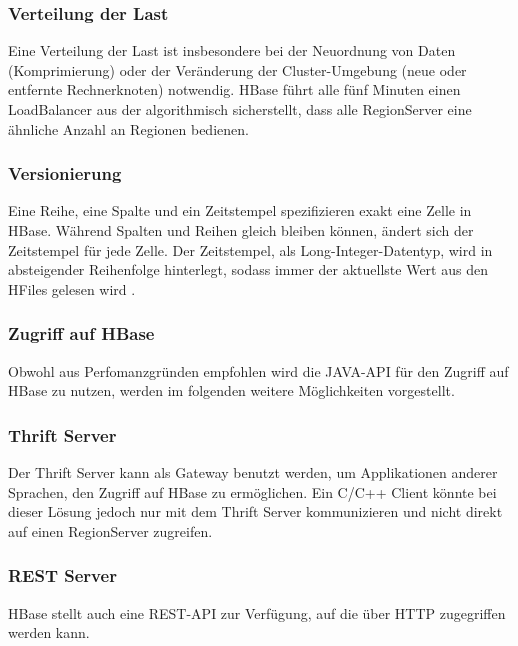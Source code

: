 \subsubsection{Verteilung der Last}
Eine Verteilung der Last ist insbesondere bei der Neuordnung von Daten (Komprimierung) oder der Veränderung der Cluster-Umgebung (neue oder entfernte Rechnerknoten) notwendig.
HBase führt alle fünf Minuten einen LoadBalancer aus der algorithmisch sicherstellt, dass alle RegionServer eine ähnliche Anzahl an Regionen bedienen. 

 \subsubsection{Versionierung}
Eine Reihe, eine Spalte und ein Zeitstempel spezifizieren exakt eine Zelle in HBase. Während Spalten und Reihen gleich bleiben können, ändert sich der Zeitstempel für jede Zelle. Der Zeitstempel, als Long-Integer-Datentyp, wird in absteigender Reihenfolge hinterlegt, sodass immer der aktuellste Wert aus den HFiles gelesen wird \cite{reference}.


\subsubsection{Zugriff auf HBase}
Obwohl aus Perfomanzgründen empfohlen wird die JAVA-API für den Zugriff auf HBase zu nutzen, werden im folgenden weitere Möglichkeiten vorgestellt.

\subsubsection{Thrift Server}
Der Thrift Server kann als Gateway benutzt werden, um Applikationen  anderer Sprachen, den Zugriff auf HBase zu ermöglichen. Ein C/C++ Client könnte bei dieser Lösung jedoch nur mit dem Thrift Server kommunizieren und nicht direkt auf einen RegionServer zugreifen.

\subsubsection{REST Server}
HBase stellt auch eine REST-API zur Verfügung, auf die über HTTP zugegriffen werden kann.



